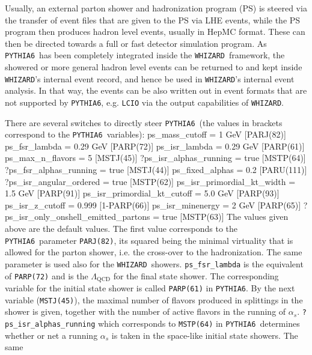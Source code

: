 \documentclass[12pt]{book}
\newenvironment{code}%
  {\begingroup\footnotesize
   \quote
   \Verbatim}%
  {\endVerbatim
   \endquote
   \endgroup\noindent}
\newcommand{\ttt}[1]{\texttt{#1}}
\newcommand{\whizard}{\ttt{WHIZARD}}
\newcommand{\pythiasix}{\ttt{PYTHIA6}}
\begin{document}
Usually, an external parton shower and hadronization program (PS) is
steered via the transfer of event files that are given to the PS via
LHE events, while the PS program then produces hadron level events,
usually in HepMC format. These can then be directed towards a full or
fast detector simulation program. As \pythiasix\ has been completely
integrated inside the \whizard\ framework, the showered or more
general hadron level events can be returned to and kept inside
\whizard's internal event record, and hence be used in \whizard's
internal event analysis. In that way, the events can be also written
out in event formats that are not supported by \pythiasix,
e.g. \ttt{LCIO} via the output capabilities of \whizard.

There are several switches to directly steer \pythiasix\ (the values
in brackets correspond to the \pythiasix\ variables):
\begin{code}
  ps_mass_cutoff = 1 GeV                  [PARJ(82)]
  ps_fsr_lambda = 0.29 GeV                [PARP(72)]
  ps_isr_lambda = 0.29 GeV                [PARP(61)]
  ps_max_n_flavors = 5                    [MSTJ(45)]
  ?ps_isr_alphas_running = true           [MSTP(64)]
  ?ps_fsr_alphas_running = true           [MSTJ(44)]
  ps_fixed_alphas = 0.2                   [PARU(111)]
  ?ps_isr_angular_ordered = true          [MSTP(62)]
  ps_isr_primordial_kt_width = 1.5 GeV    [PARP(91)]
  ps_isr_primordial_kt_cutoff = 5.0 GeV   [PARP(93)]
  ps_isr_z_cutoff = 0.999                 [1-PARP(66)]
  ps_isr_minenergy = 2 GeV                [PARP(65)]
  ?ps_isr_only_onshell_emitted_partons =
        true                              [MSTP(63)]
\end{code}
The values given above are the default values. The first value
corresponds to the \pythiasix\ parameter \ttt{PARJ(82)}, its
squared being the minimal virtuality that is allowed for the parton
shower, i.e. the cross-over to the hadronization. The same parameter
is used also for the \whizard\ showers. \ttt{ps\_fsr\_lambda} is
the equivalent of \ttt{PARP(72)} and is the $\Lambda_{\text{QCD}}$
for the final state shower. The corresponding variable for the initial
state shower is called \ttt{PARP(61)} in \pythiasix. By the next
variable (\ttt{MSTJ(45)}), the maximal number of flavors produced
in splittings in the shower is given, together with the number of
active flavors in the running of
$\alpha_s$. \ttt{?ps\_isr\_alphas\_running} which corresponds to
\ttt{MSTP(64)} in \pythiasix\ determines whether or net a running
$\alpha_s$ is taken in the space-like initial state showers. The same
\end{document}
